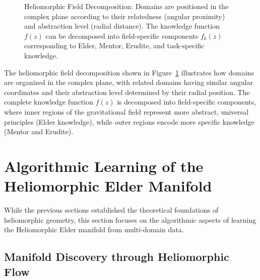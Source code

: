 \begin{figure}[h]
\caption{Heliomorphic Field Decomposition: Domains are positioned in the complex plane according to their relatedness (angular proximity) and abstraction level (radial distance). The knowledge function $f(z)$ can be decomposed into field-specific components $f_k(z)$ corresponding to Elder, Mentor, Erudite, and task-specific knowledge.}
\label{fig:gravitational_field_decomposition}
\end{figure}

The heliomorphic field decomposition shown in Figure~\ref{fig:gravitational_field_decomposition} illustrates how domains are organized in the complex plane, with related domains having similar angular coordinates and their abstraction level determined by their radial position. The complete knowledge function $f(z)$ is decomposed into field-specific components, where inner regions of the gravitational field represent more abstract, universal principles (Elder knowledge), while outer regions encode more specific knowledge (Mentor and Erudite).

\section{Algorithmic Learning of the Heliomorphic Elder Manifold}

While the previous sections established the theoretical foundations of heliomorphic geometry, this section focuses on the algorithmic aspects of learning the Heliomorphic Elder manifold from multi-domain data.

\subsection{Manifold Discovery through Heliomorphic Flow}

